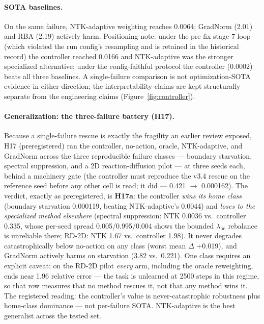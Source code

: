 \documentclass{article}
\begin{document}
\paragraph{SOTA baselines.}
\label{sec:sota}
On the same failure, NTK-adaptive weighting \cite{wang2021learning} reaches
0.0064; GradNorm \cite{chen2018gradnorm} (2.01) and RBA
\cite{anagnostopoulos2024residual} (2.19) actively harm. Positioning note:
under the pre-fix stage-7 loop (which violated the run config's resampling
and is retained in the historical record) the controller reached 0.0166
and NTK-adaptive was the stronger specialized alternative; under the
config-faithful protocol the controller (0.0002) beats all three
baselines. A single-failure comparison is not optimization-SOTA evidence
in either direction; the interpretability claims are kept structurally
separate from the engineering claims (Figure~\ref{fig:controller}).

\paragraph{Generalization: the three-failure battery (H17).}
\label{sec:controller-battery}
Because a single-failure rescue is exactly the fragility an earlier
review exposed, H17 (preregistered) ran the controller, no-action,
oracle, NTK-adaptive, and GradNorm across the three reproducible failure
classes --- boundary starvation, spectral suppression, and a 2D
reaction-diffusion pilot --- at three seeds each, behind a machinery gate
(the controller must reproduce the v3.4 rescue on the reference seed
before any other cell is read; it did --- 0.421 $\to$ 0.000162). The
verdict, exactly as preregistered, is \textbf{H17a}: the controller
\emph{wins its home class} (boundary starvation 0.000119, beating
NTK-adaptive's 0.0044) and \emph{loses to the specialized method
elsewhere} (spectral suppression: NTK 0.0036 vs.\ controller 0.335,
whose per-seed spread 0.005/0.995/0.004 shows the bounded
$\lambda_{\mathrm{bc}}$ rebalance is unreliable there; RD-2D: NTK 1.67
vs.\ controller 1.98). It never degrades catastrophically below
no-action on any class (worst mean $\Delta$ +0.019), and GradNorm
actively harms on starvation (3.82 vs.\ 0.221). One class requires an
explicit caveat: on the RD-2D pilot \emph{every} arm, including the
oracle reweighting, ends near 1.96 relative error --- the task is
unlearned at 2500 steps in this regime, so that row measures that no
method rescues it, not that any method wins it. The registered reading:
the controller's value is never-catastrophic robustness plus home-class
dominance --- not per-failure SOTA. NTK-adaptive is the best generalist
across the tested set.
\end{document}
